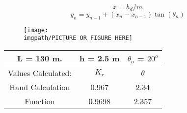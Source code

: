 

\begin{equation}
x = h_{d}/m
\end{equation}
\begin{equation}
y_{n} = y_{n - 1} + (x_{n} - x_{n - 1})\tan(\theta_{n})
\end{equation}

%

\begin{figure}[H]
\centering
\texttt{[image: \\imgpath/PICTURE OR FIGURE HERE]}
\caption{}
\label{}
\end{figure}


\begin{tabular}{|c|c|c|}
  \hline
  L = 130 m. & h = 2.5 m & $\theta_{o}$ = $20^{o}$ \\
  \hline
  Values Calculated: & $K_{r}$ & $\theta$  \\ 
  \hline
  Hand Calculation & 0.967 & 2.34\\
  \hline
  Function & 0.9698 & 2.357 \\
  \hline
\end{tabular}